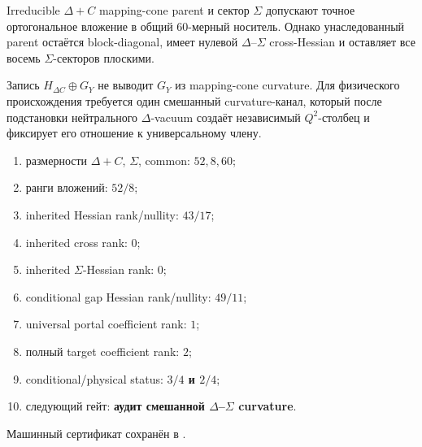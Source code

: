 \begin{theorem}
Irreducible $\Delta+C$ mapping-cone parent и сектор $\Sigma$ допускают
точное ортогональное вложение в общий $60$-мерный носитель. Однако
унаследованный parent остаётся block-diagonal, имеет нулевой
$\Delta$--$\Sigma$ cross-Hessian и оставляет все восемь $\Sigma$-секторов
плоскими.
\end{theorem}

\begin{nogocriterion}
Запись $H_{\Delta C}\oplus G_Y$ не выводит $G_Y$ из mapping-cone curvature.
Для физического происхождения требуется один смешанный curvature-канал,
который после подстановки нейтрального $\Delta$-vacuum создаёт независимый
$Q^2$-столбец и фиксирует его отношение к универсальному члену.
\end{nogocriterion}

\begin{protocol}\begin{enumerate}
\item размерности $\Delta+C$, $\Sigma$, common: \textbf{$52,8,60$};
\item ранги вложений: \textbf{$52/8$};
\item inherited Hessian rank/nullity: \textbf{$43/17$};
\item inherited cross rank: \textbf{$0$};
\item inherited $\Sigma$-Hessian rank: \textbf{$0$};
\item conditional gap Hessian rank/nullity: \textbf{$49/11$};
\item universal portal coefficient rank: \textbf{$1$};
\item полный target coefficient rank: \textbf{$2$};
\item conditional/physical status: \textbf{$3/4$ и $2/4$};
\item следующий гейт: \textbf{аудит смешанной $\Delta$--$\Sigma$ curvature}.
\end{enumerate}\end{protocol}

Машинный сертификат сохранён в
.
